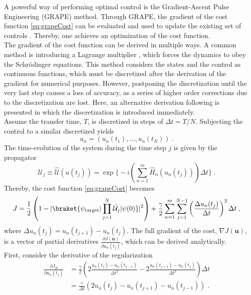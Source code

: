 A powerful way of performing optimal control is the Gradient-Ascent Pulse Engineering (GRAPE) method. Through GRAPE, the gradient of the cost function \eqref{eq:grapeCost} can be evaluated and used to update the existing set of controls \cite{Khaneja2005}. Thereby, one achieves an optimization of the cost function.\\
The gradient of the cost function can be derived in multiple ways. A common method is introducing a Lagrange multiplier \cite{Hohenester2007, Winckel2008, BECcontrol}, which forces the dynamics to obey the Schrödinger equations. This method considers the states and the control as continuous functions, which must be discretized after the derivation of the gradient for numerical purposes. However, postponing the discretization until the very last step causes a loss of accuracy, as a series of higher order corrections due to the discretization are lost.
Here, an alternative derivation following \cite{Khaneja2005, deFouquieres2011} is presented in which the discretization is introduced immediately. \\
Assume the transfer time, $T$, is discretized in steps of $\Delta t = T/N$. Subjecting the control to a similar discretized yields
\begin{equation}
	u_n = \left( u_n (t_1) , \ldots , u_n (t_N)  \right)  \; .
\end{equation}
The time-evolution of the system during the time step $j$ is given by the propagator
\begin{equation}
	\hat{\mathcal{U}}_j \equiv \hat{\mathcal{U}} (u(t_j)) = \exp \bigg\{ -i \left(  \sum_{n = 1}^{m}  \hat{H}_n (u_n(t_j))  \right) \Delta t \bigg\} \; . 
\end{equation} 
Thereby, the cost function \eqref{eq:grapeCost} becomes
\begin{equation}
	J = \frac{1}{2} \left( 1 - |\braket{\psi_{\mathrm{target}} | \prod_{j = 1}^{N} \hat{\mathcal{U}}_j | \psi (0)}|^2 \right) + \frac{\gamma}{2} \sum_{n = 1}^{m} \sum_{j = 1}^{N-1} \left( \frac{\Delta u_n (t_j)}{\Delta t} \right)^2 \Delta t \; ,
	\label{eq:discreteCost}
\end{equation}
where $\Delta u_n (t_j) =  u_n (t_{j+1}) - u_n (t_j)$. The full gradient of the cost, $\nabla J(\boldsymbol{u})$, is a vector of partial derivatives $\frac{\partial J(\boldsymbol{u})}{\partial u_n (t_j)}$, which can be derived analytically.\\
First, consider the derivative of the regularization
\begin{align}
	\frac{\partial J_R}{\partial u_n (t_j)} &= \frac{\gamma}{2} \left( 2 \frac{u_n (t_j) - u_n (t_{j-1})}{\Delta t^2} - 2 \frac{u_n (t_{j+1}) - u_n (t_j)}{\Delta t^2} \right) \Delta t \nonumber \\
	&= \frac{\gamma}{\Delta t} \left( 2 u_n (t_j) - u_n (t_{j+1}) - u_n (t_{j-1}) \right) \; . \label{eq:regularizationGrad}
\end{align}
